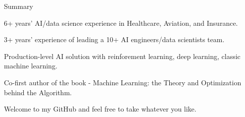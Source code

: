 \documentclass{resume} %
\begin{document}

\begin{rSection}{Summary} 

\begin{rSubsection}{}{}{}{}
\item 6+ years' AI/data science experience in Healthcare, Aviation, and Insurance.
\item 3+ years' experience of leading a 10+ AI engineers/data scientists team.
\item Production-level AI solution with reinforement learning, deep learning, classic machine learning.
\item Co-first author of the book - Machine Learning: the Theory and Optimization behind the Algorithm.
\item Welcome to my GitHub and feel free to take whatever you like.
\end{rSubsection}


\end{rSection}

\end{document}

